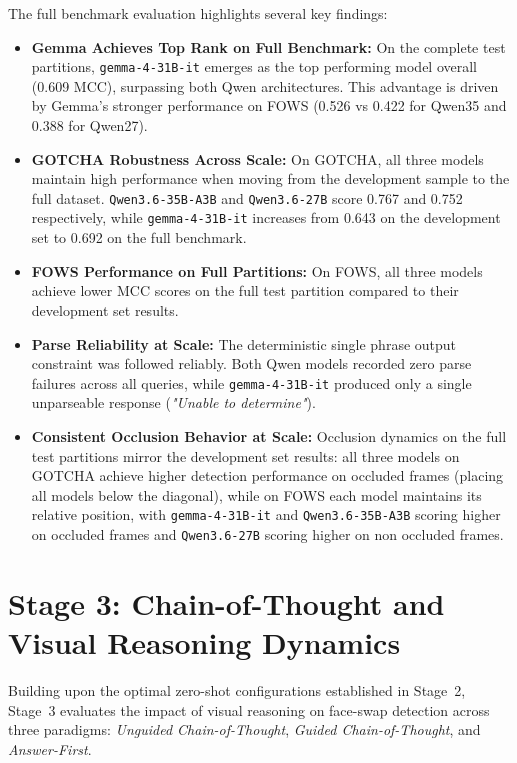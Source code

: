 The full benchmark evaluation highlights several key findings:
\begin{itemize}
    \item \textbf{Gemma Achieves Top Rank on Full Benchmark:} On the complete test partitions, \texttt{gemma-4-31B-it} emerges as the top performing model overall (\num{0.609} MCC), surpassing both Qwen architectures. This advantage is driven by Gemma's stronger performance on FOWS (\num{0.526} vs \num{0.422} for Qwen35 and \num{0.388} for Qwen27).
    \item \textbf{GOTCHA Robustness Across Scale:} On GOTCHA, all three models maintain high performance when moving from the development sample to the full dataset. \texttt{Qwen3.6-35B-A3B} and \texttt{Qwen3.6-27B} score \num{0.767} and \num{0.752} respectively, while \texttt{gemma-4-31B-it} increases from \num{0.643} on the development set to \num{0.692} on the full benchmark.
    \item \textbf{FOWS Performance on Full Partitions:} On FOWS, all three models achieve lower MCC scores on the full test partition compared to their development set results.
    \item \textbf{Parse Reliability at Scale:} The deterministic single phrase output constraint was followed reliably. Both Qwen models recorded zero parse failures across all queries, while \texttt{gemma-4-31B-it} produced only a single unparseable response (\emph{"Unable to determine"}).
    \item \textbf{Consistent Occlusion Behavior at Scale:} Occlusion dynamics on the full test partitions mirror the development set results: all three models on GOTCHA achieve higher detection performance on occluded frames (placing all models below the diagonal), while on FOWS each model maintains its relative position, with \texttt{gemma-4-31B-it} and \texttt{Qwen3.6-35B-A3B} scoring higher on occluded frames and \texttt{Qwen3.6-27B} scoring higher on non occluded frames.
\end{itemize}

\section{Stage 3: Chain-of-Thought and Visual Reasoning Dynamics}
\label{sec:results_stage3}

Building upon the optimal zero-shot configurations established in Stage~2, Stage~3 evaluates the impact of visual reasoning on face-swap detection across three paradigms: \emph{Unguided Chain-of-Thought}, \emph{Guided Chain-of-Thought}, and \emph{Answer-First}.

